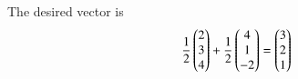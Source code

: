 The desired vector is
\begin{align}
\frac{1}{2}\begin{pmatrix}2\\3\\4\end{pmatrix} +  \frac{1}{2}\begin{pmatrix}4\\1\\-2\end{pmatrix} =\begin{pmatrix}3\\2\\1\end{pmatrix} 
\end{align}



